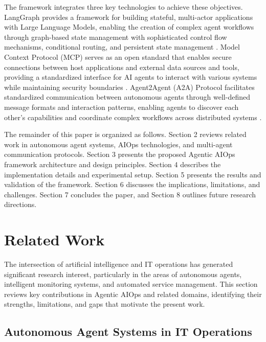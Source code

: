 \documentclass{article}
\begin{document}
The framework integrates three key technologies to achieve these objectives. LangGraph provides a framework for building stateful, multi-actor applications with Large Language Models, enabling the creation of complex agent workflows through graph-based state management with sophisticated control flow mechanisms, conditional routing, and persistent state management \cite{langchain2024}. Model Context Protocol (MCP) serves as an open standard that enables secure connections between host applications and external data sources and tools, providing a standardized interface for AI agents to interact with various systems while maintaining security boundaries \cite{anthropic2024}. Agent2Agent (A2A) Protocol facilitates standardized communication between autonomous agents through well-defined message formats and interaction patterns, enabling agents to discover each other's capabilities and coordinate complex workflows across distributed systems \cite{openai2024}.

The remainder of this paper is organized as follows. Section 2 reviews related work in autonomous agent systems, AIOps technologies, and multi-agent communication protocols. Section 3 presents the proposed Agentic AIOps framework architecture and design principles. Section 4 describes the implementation details and experimental setup. Section 5 presents the results and validation of the framework. Section 6 discusses the implications, limitations, and challenges. Section 7 concludes the paper, and Section 8 outlines future research directions.

\section{Related Work}

The intersection of artificial intelligence and IT operations has generated significant research interest, particularly in the areas of autonomous agents, intelligent monitoring systems, and automated service management. This section reviews key contributions in Agentic AIOps and related domains, identifying their strengths, limitations, and gaps that motivate the present work.

\subsection{Autonomous Agent Systems in IT Operations}
\end{document}
